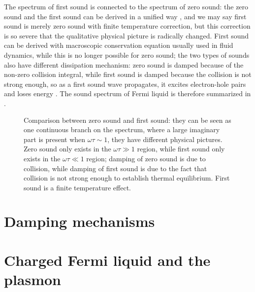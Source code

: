 \documentclass[hyperref, a4paper]{article}
\begin{document}
The spectrum of first sound 
is connected to the spectrum of zero sound:
the zero sound and the first sound can be derived 
in a unified way \cite{khalatnikov1958dispersion},
and we may say first sound is 
merely zero sound with finite temperature correction, 
but this correction is so severe that the qualitative physical picture 
is radically changed.
First sound can be derived with macroscopic conservation equation 
usually used in fluid dynamics,
while this is no longer possible for zero sound;
the two types of sounds also have different dissipation mechanism:
zero sound is damped because of the non-zero collision integral,
while first sound is damped because the collision is not strong enough,
so as a first sound wave propagates,
it excites electron-hole pairs 
and loses energy
\cite{abel1966propagation,belitz2022soft}. 
The sound spectrum of Fermi liquid is therefore summarized in .

\begin{figure}
    \centering
    
    \caption{Comparison between zero sound and first sound: 
    they can be seen as one continuous branch 
    on the spectrum, 
    where a large imaginary part is present when $\omega \tau \sim 1$,
    they have different physical pictures.
    Zero sound only exists in the $\omega \tau \gg 1$ region,
    while first sound only exists in the $\omega \tau \ll 1$ region;
    damping of zero sound is due to collision,
    while damping of first sound is due to the fact that
    collision is not strong enough to establish thermal equilibrium.
    First sound is a finite temperature effect.}
    \label{fig:sound-comparison}
\end{figure}

\section{Damping mechanisms}



\section{Charged Fermi liquid and the plasmon}\label{sec:charged-fermi-liquid}
\end{document}
